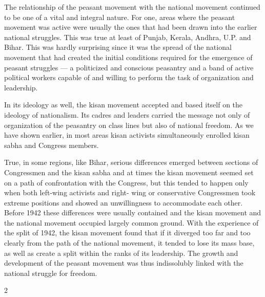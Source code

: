 \begin{multicols}{2}
The relationship of the peasant movement with the national movement continued to be one of a vital and integral nature. For one, areas where the peasant movement was active were usually the ones that had been drawn into the earlier national struggles. This was true at least of Punjab, Kerala, Andhra, U.P. and Bihar. This was hardly surprising since it was the spread of the national movement that had created the initial conditions required for the emergence of peasant struggles --- a politicized and conscious peasantry and a band of active political workers capable of and willing to perform the task of organization and leadership.

In its ideology as well, the kisan movement accepted and based itself on the ideology of nationalism. Its cadres and leaders carried the message not only of organization of the peasantry on class lines but also of national freedom. As we have shown earlier, in most areas kisan activists simultaneously enrolled kisan sabha and Congress members.

True, in some regions, like Bihar, serious differences emerged between sections of Congressmen and the kisan sabha and at times the kisan movement seemed set on a path of confrontation with the Congress, but this tended to happen only when both left-wing activists and right- wing or conservative Congressmen took extreme positions and showed an unwillingness to accommodate each other. Before 1942 these differences were usually contained and the kisan movement and the national movement occupied largely common ground. With the experience of the split of 1942, the kisan movement found that if it diverged too far and too clearly from the path of the national movement, it tended to lose its mass base, as well as create a split within the ranks of its leadership. The growth and development of the peasant movement was thus indissolubly linked with the national struggle for freedom.
\end{multicols}{2}
